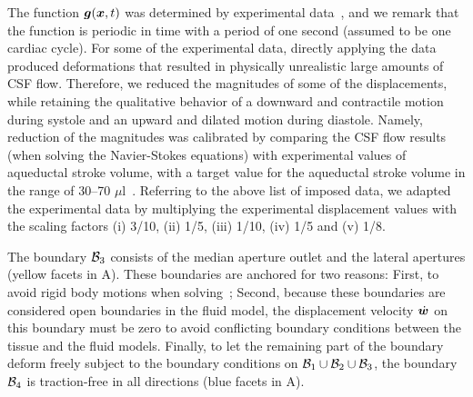 \documentclass{template}
\begin{document}
The function $\bm{g}(\bm{x}, t)$ was determined by experimental
data~\citep{Kurtcuoglu2007ComputationalSylvius,
Enzmann1992BrainImaging, soellinger20093d, soellinger2007assessment,
greitz1992pulsatile, almudayni2023magnetic, pahlavian2018regional},
and we remark that the function is periodic in time with a period of
one second (assumed to be one cardiac cycle).
For some of the experimental data, directly applying the data produced
deformations that resulted in physically unrealistic large amounts of CSF flow.
Therefore, we reduced the magnitudes of some of the displacements,
while retaining the qualitative behavior
of a downward and contractile motion during systole and an upward
and dilated motion during diastole. Namely, reduction of the magnitudes was 
calibrated by comparing the CSF flow results (when solving the Navier-Stokes equations) with experimental values
of aqueductal stroke volume, with a target value for the aqueductal stroke
volume in the range of 30--70 $\mu$l~\citep{eide2021direction, wagshul2011pulsating}. 
Referring to the above list of imposed data, we adapted the experimental data by multiplying
the experimental displacement values with the scaling factors (i) 3/10, (ii) 1/5, (iii) 1/10, (iv) 1/5 and (v) 1/8.

The boundary $\mathcal{B}_3$ consists of the median aperture outlet
and the lateral apertures (yellow facets in A).
These boundaries are anchored for two reasons:
First, to avoid rigid body motions when solving~;
Second, because these boundaries are
considered open boundaries in the fluid model, the displacement velocity
$\dot{\bm{w}}$ on this boundary must be zero to avoid conflicting boundary conditions
between the tissue and the fluid models.
Finally, to let the remaining part of the boundary deform freely subject to the boundary conditions
on $\mathcal{B}_1\cup\mathcal{B}_2\cup\mathcal{B}_3$, the boundary $\mathcal{B}_4$ is traction-free in all directions
(blue facets in A).
\end{document}
